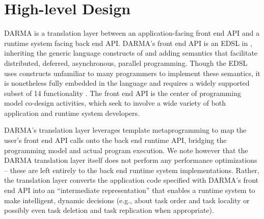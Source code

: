 \section{High-level Design}
\gls{DARMA} is a translation layer between an 
application-facing \gls{front end} \gls{API} and a \gls{runtime system} facing \gls{back end} 
\gls{API}. 
\gls{DARMA}'s \gls{front end} \gls{API} 
is an \gls{EDSL} in \CC,  inheriting the generic
language constructs of \CC and adding \gls{semantics} that facilitate
distributed, deferred, asynchronous, parallel programming. Though the \gls{EDSL} uses
\CC{} constructs unfamiliar to many programmers to implement these semantics, 
it is nonetheless fully embedded in the \CC{} language and
requires a widely supported subset of \CC{}14 functionality \compilerReqs.
The \gls{front end} \gls{API} is the center of \gls{programming model}
\gls{co-design} activities, which seek to involve a wide variety of both
application and \gls{runtime system} developers. 


\gls{DARMA}'s \gls{translation layer} leverages \CC{} \gls{template
metaprogramming} to map the user's \gls{front end} \gls{API} calls onto the \gls{back end} runtime \gls{API},
bridging the \gls{programming model} and actual program execution.
We note however that the \gls{DARMA} \gls{translation layer} itself does not
perform any performance optimizations -- these are left entirely to the \gls{back end} \gls{runtime system} implementations.
Rather, the translation layer converts the application code specified with
\gls{DARMA}'s \gls{front end} \gls{API} into
an ``intermediate representation'' that enables a \gls{runtime system} to make
intelligent, dynamic decisions (e.g., 
about \gls{task} order and \gls{task} locality or possibly even \gls{task}
deletion and \gls{task} replication when appropriate).

